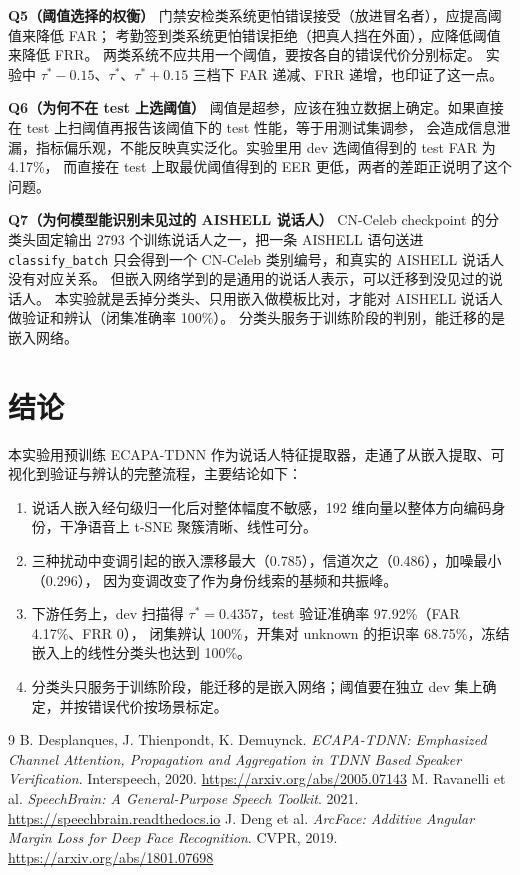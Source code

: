 \documentclass[a4paper]{article}
\begin{document}
\textbf{Q5（阈值选择的权衡）} \quad
门禁安检类系统更怕错误接受（放进冒名者），应提高阈值来降低 FAR；
考勤签到类系统更怕错误拒绝（把真人挡在外面），应降低阈值来降低 FRR。
两类系统不应共用一个阈值，要按各自的错误代价分别标定。
实验中 $\tau^\ast-0.15$、$\tau^\ast$、$\tau^\ast+0.15$ 三档下 FAR 递减、FRR 递增，也印证了这一点。

\textbf{Q6（为何不在 test 上选阈值）} \quad
阈值是超参，应该在独立数据上确定。如果直接在 test 上扫阈值再报告该阈值下的 test 性能，等于用测试集调参，
会造成信息泄漏，指标偏乐观，不能反映真实泛化。实验里用 dev 选阈值得到的 test FAR 为 4.17\%，
而直接在 test 上取最优阈值得到的 EER 更低，两者的差距正说明了这个问题。

\textbf{Q7（为何模型能识别未见过的 AISHELL 说话人）} \quad
CN-Celeb checkpoint 的分类头固定输出 2793 个训练说话人之一，把一条 AISHELL 语句送进 \texttt{classify\_batch}
只会得到一个 CN-Celeb 类别编号，和真实的 AISHELL 说话人没有对应关系。
但嵌入网络学到的是通用的说话人表示，可以迁移到没见过的说话人。
本实验就是丢掉分类头、只用嵌入做模板比对，才能对 AISHELL 说话人做验证和辨认（闭集准确率 100\%）。
分类头服务于训练阶段的判别，能迁移的是嵌入网络。

\section{结论}
本实验用预训练 ECAPA-TDNN 作为说话人特征提取器，走通了从嵌入提取、可视化到验证与辨认的完整流程，主要结论如下：
\begin{enumerate}
  \item 说话人嵌入经句级归一化后对整体幅度不敏感，192 维向量以整体方向编码身份，干净语音上 t-SNE 聚簇清晰、线性可分。
  \item 三种扰动中变调引起的嵌入漂移最大（0.785），信道次之（0.486），加噪最小（0.296），
        因为变调改变了作为身份线索的基频和共振峰。
  \item 下游任务上，dev 扫描得 $\tau^\ast=0.4357$，test 验证准确率 97.92\%（FAR 4.17\%、FRR 0），
        闭集辨认 100\%，开集对 unknown 的拒识率 68.75\%，冻结嵌入上的线性分类头也达到 100\%。
  \item 分类头只服务于训练阶段，能迁移的是嵌入网络；阈值要在独立 dev 集上确定，并按错误代价按场景标定。
\end{enumerate}

\begin{thebibliography}{9}
 B. Desplanques, J. Thienpondt, K. Demuynck.
  \emph{ECAPA-TDNN: Emphasized Channel Attention, Propagation and Aggregation in TDNN Based Speaker Verification}.
  Interspeech, 2020. \url{https://arxiv.org/abs/2005.07143}
 M. Ravanelli et al. \emph{SpeechBrain: A General-Purpose Speech Toolkit}.
  2021. \url{https://speechbrain.readthedocs.io}
 J. Deng et al. \emph{ArcFace: Additive Angular Margin Loss for Deep Face Recognition}.
  CVPR, 2019. \url{https://arxiv.org/abs/1801.07698}
\end{thebibliography}
\end{document}
